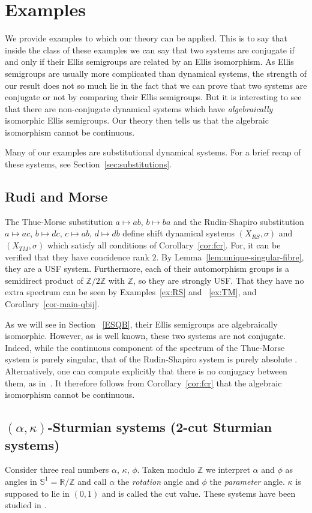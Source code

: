 \documentclass[10pt,a4paper]{amsart}
\numberwithin{equation}{section}
\newcommand{\Z}{\mathbb Z}
\newcommand{\R}{\mathbb{R}}
\newcommand{\al}{\alpha}
\newcommand{\cut}{\kappa}
\begin{document}
\section{Examples}\label{sec:Examples}
We provide examples to which our theory can be applied. This is to say that inside the class of these examples we can say that two systems are conjugate if and only if their Ellis semigroups are {related by an Ellis  isomorphism}. As Ellis semigroups are usually more complicated than dynamical systems, the strength of our result does not so much lie in the fact that we can prove that two systems are conjugate or not by comparing their Ellis semigroups. But it is interesting to see that there are non-conjugate dynamical systems which have \emph{algebraically} isomorphic Ellis semigroups. Our theory then tells us that the algebraic isomorphism cannot be continuous. 

Many of our examples are substitutional dynamical systems. For a brief recap of these systems, see Section~\ref{sec:substitutions}.

\subsection{Rudi and Morse}
The Thue-Morse substitution $a\mapsto ab$, $b\mapsto ba$ and the 
Rudin-Shapiro substitution $a\mapsto ac$, $b\mapsto dc$,  $c\mapsto ab$, $d\mapsto db$ define shift dynamical systems $(X_{RS},\sigma)$ and $(X_{TM},\sigma)$ which satisfy all 
conditions of Corollary~\ref{cor:fcr}. For, it can be verified that they have concidence rank $2$. By Lemma~\ref{lem:unique-singular-fibre}, they are a USF system.  Furthermore, each of their automorphism groups is a semidirect product of $\Z/2\Z$ with  $\Z$, so they are strongly USF. That they have no extra spectrum can be seen by Examples~\ref{ex:RS} and ~\ref{ex:TM},  and Corollary~\ref{cor-main-qbij}.

 As we will see in Section ~\ref{ESQB}, their Ellis semigroups are algebraically isomorphic. However, as is well known, these two systems are not conjugate. Indeed, while the continuous component of the spectrum of the Thue-Morse system is purely singular, that of the Rudin-Shapiro system is purely absolute \cite{Baake-Grimm}. Alternatively, one can compute explicitly that there is no conjugacy between them, as in~\cite{CQY}. It therefore follows from Corollary~\ref{cor:fcr} that the 
algebraic isomorphism cannot be continuous. 

\subsection{$(\al, \cut)$-Sturmian systems (2-cut Sturmian systems)}
\label{ex:Sturmian} 
Consider three real numbers $\al$, $\cut$, $\phi$. Taken modulo $\Z$ we interpret $\al$ and $\phi$ as angles in $\mathbb S^1=\R/\Z$ and call 
$\al$ the {\em rotation} angle and $\phi$ the {\em parameter} angle. $\cut$ is supposed to lie in $(0,1)$ and is called the cut value. These systems have been studied in \cite{PS}.
\end{document}
